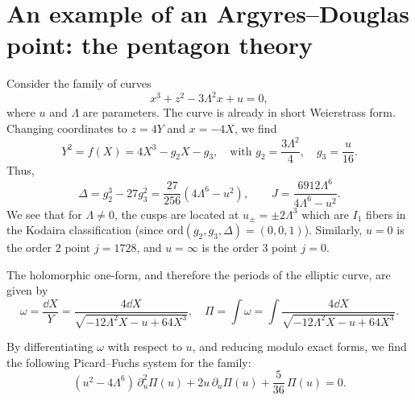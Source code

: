 \documentclass[11pt, a4paper]{article}
\numberwithin{equation}{section}
\begin{document}
\section{An example of an Argyres--Douglas point: the pentagon theory}
Consider the family of curves
\begin{equation}
  x^3+z^2-3 \Lambda^2 x+u=0,
\end{equation}
where $u$ and $\Lambda$ are parameters.
The curve is already in short Weierstrass form. Changing coordinates to $z = 4 Y$ and $x = -4 X$, we find
\begin{equation}
  Y^2 = f(X) = 4 X^3 - g_2 X - g_3, \quad \text{with } g_2 = \frac{3 \Lambda^2}{4}, \quad g_3 = \frac{u}{16}.
\end{equation}
Thus,
\begin{equation}
  \Delta = g_2^3 - 27 g_3^2 = \frac{27}{256} \left(4 \Lambda^6-u^2\right), \qquad J = \frac{6912 \Lambda^6}{4 \Lambda^6-u^2}.
\end{equation}
We see that for $\Lambda \neq 0$, the cusps are located at $u_{\pm} = \pm 2 \Lambda^3$ which are $I_1$ fibers in the Kodaira classification (since $\mathrm{ord}(g_2, g_3, \Delta) = (0, 0, 1)$). Similarly, $u = 0$ is the order $2$ point $j = 1728$, and $u = \infty$ is the order $3$ point $j = 0$.

The holomorphic one-form, and therefore the periods of the elliptic curve, are given by
\begin{equation}
  \omega = \frac{\dd{X}}{Y} = \frac{4 \dd{X}}{\sqrt{-12 \Lambda^2 X-u+64 X^3}}, \quad \Pi = \int \omega = \int \frac{4 \dd{X}}{\sqrt{-12 \Lambda^2 X-u+64 X^3}}.
\end{equation}

By differentiating $\omega$ with respect to $u$, and reducing modulo exact forms, we find the following Picard--Fuchs system for the family:
\begin{equation}\label{eq:pent-pf}
  (u^2 - 4 \Lambda^6) \, \partial_u^2 \Pi(u) + 2 u \, \partial_u \Pi(u) + \frac{5}{36} \, \Pi(u) = 0.
\end{equation}
\end{document}
